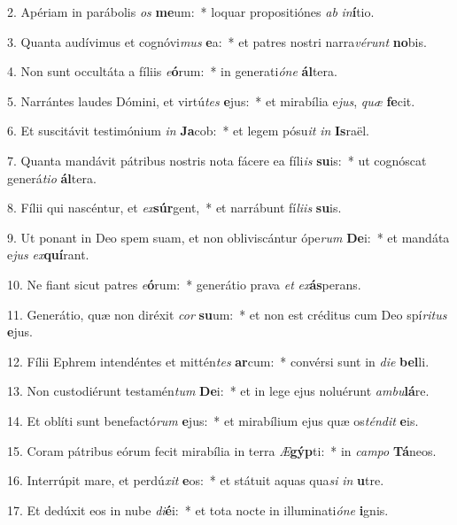 2. Apériam in parábolis \textit{os} \textbf{me}um:~*  loquar propositiónes \textit{ab} \textit{in}\textbf{í}tio.\

3. Quanta audívimus et cognóvi\textit{mus} \textbf{e}a:~*  et patres nostri narra\textit{vé}\textit{runt} \textbf{no}bis.\

4. Non sunt occultáta a fíliis \textit{e}\textbf{ó}rum:~*  in generati\textit{ó}\textit{ne} \textbf{ál}tera.\

5. Narrántes laudes Dómini, et virtú\textit{tes} \textbf{e}jus:~*  et mirabília e\textit{jus}, \textit{quæ} \textbf{fe}cit.\

6. Et suscitávit testimónium \textit{in} \textbf{Ja}cob:~*  et legem pósu\textit{it} \textit{in} \textbf{Is}raël.\

7. Quanta mandávit pátribus nostris nota fácere ea fíli\textit{is} \textbf{su}is:~*  ut cognóscat generá\textit{ti}\textit{o} \textbf{ál}tera.\

8. Fílii qui nascéntur, et \textit{ex}\textbf{súr}gent,~*  et narrábunt fí\textit{li}\textit{is} \textbf{su}is.\

9. Ut ponant in Deo spem suam, et non obliviscántur ópe\textit{rum} \textbf{De}i:~*  et mandáta e\textit{jus} \textit{ex}\textbf{quí}rant.\

10. Ne fiant sicut patres \textit{e}\textbf{ó}rum:~*  generátio prava \textit{et} \textit{ex}\textbf{ás}perans.\

11. Generátio, quæ non diréxit \textit{cor} \textbf{su}um:~*  et non est créditus cum Deo spí\textit{ri}\textit{tus} \textbf{e}jus.\

12. Fílii Ephrem intendéntes et mittén\textit{tes} \textbf{ar}cum:~*  convérsi sunt in \textit{di}\textit{e} \textbf{bel}li.\

13. Non custodiérunt testamén\textit{tum} \textbf{De}i:~*  et in lege ejus noluérunt \textit{am}\textit{bu}\textbf{lá}re.\

14. Et oblíti sunt benefactó\textit{rum} \textbf{e}jus:~*  et mirabílium ejus quæ os\textit{tén}\textit{dit} \textbf{e}is.\

15. Coram pátribus eórum fecit mirabília in terra \textit{Æ}\textbf{gýp}ti:~*  in \textit{cam}\textit{po} \textbf{Tá}neos.\

16. Interrúpit mare, et perdú\textit{xit} \textbf{e}os:~*  et státuit aquas qua\textit{si} \textit{in} \textbf{u}tre.\

17. Et dedúxit eos in nube \textit{di}\textbf{é}i:~*  et tota nocte in illuminati\textit{ó}\textit{ne} \textbf{i}gnis.\

